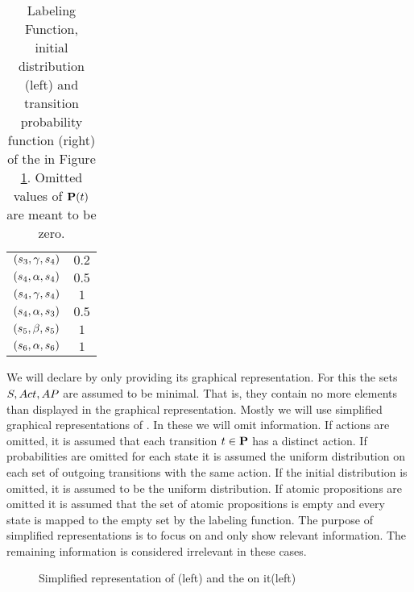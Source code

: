 \documentclass[preview]{standalone}
\begin{document}
\begin{exmp}
\begin{table}[h!]
{\begin{center}
\begin{tabular}{c|c}
				$({s}_3,{\gamma}, {s}_4)$ & $0.2$\\
				$({s}_4,{\alpha}, {s}_4)$ & $0.5$\\
				$({s}_4,{\gamma}, {s}_4)$ & $1$\\
				$({s}_4,{\alpha}, {s}_3)$ & $0.5$\\
				$({s}_5,{\beta}, {s}_5)$ & $1$\\
				$({s}_6,{\alpha}, {s}_6)$ & $1$\\				
			\end{tabular}
		\end{center}
	}
	\caption{Labeling Function, initial distribution (left) and transition probability function (right) of the \mdpN in Figure \ref{fig:exampleMdp}. Omitted values of ${{\textbf{P}}}(t)$ are meant to be zero.}
	\label{tab:atomicpropsandlabelingfunction}
\end{table}

We will declare \mdpsN by only providing its graphical representation. For this the sets ${S}, {Act}, {AP}$ are assumed to be minimal. That is, they contain no more elements than displayed in the graphical representation. Mostly we will use simplified graphical representations of \mdpsN. In these we will omit information. If actions are omitted, it is assumed that each transition $t \in {\ensuremath{{\textbf{P}}}}$ has a distinct action. If probabilities are omitted for each state it is assumed the uniform distribution on each set of outgoing transitions with the same action. If the initial distribution is omitted, it is assumed to be the uniform distribution. If atomic propositions are omitted it is assumed that the set of atomic propositions is empty and every state is mapped to the empty set by the labeling function. The purpose of simplified representations is to focus on and only show relevant information. The remaining information is considered irrelevant in these cases.

\begin{figure}[!htb]
	\centering 
	\caption{Simplified representation of \mdp (left) and the \viewN \viewinitstates on it(left)}
	\label{fig:exampleMdp}  
\end{figure}
\end{exmp}
\end{document}
